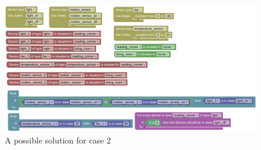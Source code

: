 \documentclass[11pt,a4paper]{report}
\begin{document}
\begin{idplisting}
\begin{figure}
    \centering
    \includegraphics[width=1\linewidth]{images/case_2_homy.png}
    \caption{A possible solution for case 2}
    \label{fig:case_2_solution}
\end{figure}


\end{idplisting}
\end{document}
